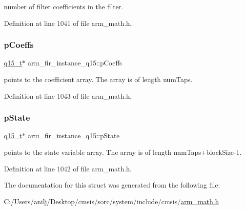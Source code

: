 number of filter coefficients in the filter. 

Definition at line 1041 of file arm\+\_\+math.\+h.

\mbox{\label{structarm__fir__instance__q15_a6d16db16a5f8f0db54938f2967244d9e}} 
\subsubsection{\texorpdfstring{p\+Coeffs}{pCoeffs}}
{\footnotesize\ttfamily \hyperlink{arm__math_8h_ab5a8fb21a5b3b983d5f54f31614052ea}{q15\+\_\+t}$\ast$ arm\+\_\+fir\+\_\+instance\+\_\+q15\+::p\+Coeffs}

points to the coefficient array. The array is of length num\+Taps. 

Definition at line 1043 of file arm\+\_\+math.\+h.

\mbox{\label{structarm__fir__instance__q15_aa8d25f44f45b6a6c4cf38c31569b8a01}} 
\subsubsection{\texorpdfstring{p\+State}{pState}}
{\footnotesize\ttfamily \hyperlink{arm__math_8h_ab5a8fb21a5b3b983d5f54f31614052ea}{q15\+\_\+t}$\ast$ arm\+\_\+fir\+\_\+instance\+\_\+q15\+::p\+State}

points to the state variable array. The array is of length num\+Taps+block\+Size-\/1. 

Definition at line 1042 of file arm\+\_\+math.\+h.



The documentation for this struct was generated from the following file\+:\begin{DoxyCompactItemize}
\item 
C\+:/\+Users/anilj/\+Desktop/cmsis/sorc/system/include/cmsis/\hyperlink{arm__math_8h}{arm\+\_\+math.\+h}\end{DoxyCompactItemize}
